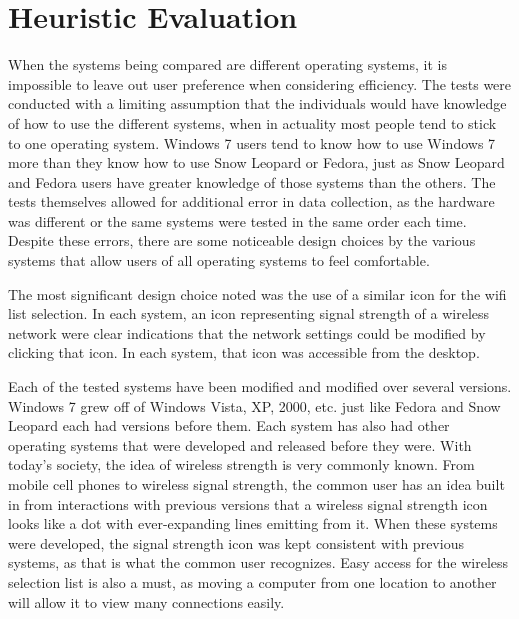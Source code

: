 \documentclass[11pt,letterpaper]{report}
\begin{document}
\chapter{Heuristic Evaluation}
When the systems being compared are different operating systems, it is impossible to leave out user preference when considering efficiency. The tests were conducted with a limiting assumption that the individuals would have knowledge of how to use the different systems, when in actuality most people tend to stick to one operating system. Windows 7 users tend to know how to use Windows 7 more than they know how to use Snow Leopard or Fedora, just as Snow Leopard and Fedora users have greater knowledge of those systems than the others. The tests themselves allowed for additional error in data collection, as the hardware was different or the same systems were tested in the same order each time. Despite these errors, there are some noticeable design choices by the various systems that allow users of all operating systems to feel comfortable.

The most significant design choice noted was the use of a similar icon for the wifi list selection. In each system, an icon representing signal strength of a wireless network were clear indications that the network settings could be modified by clicking that icon. In each system, that icon was accessible from the desktop. 

Each of the tested systems have been modified and modified over several versions. Windows 7 grew off of Windows Vista, XP, 2000, etc. just like Fedora and Snow Leopard each had versions before them. Each system has also had other operating systems that were developed and released before they were. With today's society, the idea of wireless strength is very commonly known. From mobile cell phones to wireless signal strength, the common user has an idea built in from interactions with previous versions that a wireless signal strength icon looks like a dot with ever-expanding lines emitting from it. When these systems were developed, the signal strength icon was kept consistent with previous systems, as that is what the common user recognizes. Easy access for the wireless selection list is also a must, as moving a computer from one location to another will allow it to view many connections easily. 
\end{document}
